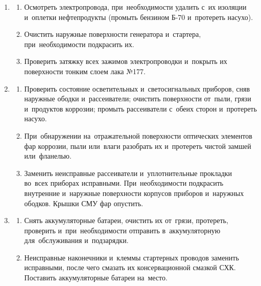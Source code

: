 \begin{enumerate}
    \item \begin{enumerate}
        \item 
        Осмотреть электропровода, при~необходимости удалить с~их изоляции и~оплетки нефтепродукты (промыть бензином Б-70 и~протереть насухо). 
        \item 
        Очистить наружные поверхности генератора и~стартера, при~необходимости подкрасить их. 
        \item 
        Проверить затяжку всех зажимов электропроводки и~покрыть их поверхности тонким слоем лака №177. 
    \end{enumerate}

    \item \begin{enumerate}
        \item 
        Проверить состояние осветительных и~светосигнальных приборов, сняв наружные ободки и~рассеиватели; очистить поверхности от~пыли, грязи и~продуктов коррозии; промыть рассеиватели с~обеих сторон и~протереть насухо. 
        \item 
        При~обнаружении на~отражательной поверхности оптических элементов фар коррозии, пыли или~влаги разобрать их и~протереть чистой замшей или~фланелью. 
        \item 
        Заменить неисправные рассеиватели и~уплотнительные прокладки во~всех приборах исправными. При~необходимости подкрасить внутренние и~наружные поверхности корпусов приборов и~наружных ободков. Крышки СМУ фар опустить. 
    \end{enumerate}

    \item \begin{enumerate}
        \item 
        Снять аккумуляторные батареи, очистить их от~грязи, протереть, проверить и~при~необходимости отправить в~аккумуляторную для~обслуживания и~подзарядки. 
        \item 
        Неисправные наконечники и~клеммы стартерных проводов заменить исправными, после чего смазать их консервационной смазкой СХК. Поставить аккумуляторные батареи на~место. 
    \end{enumerate}


\end{enumerate}
